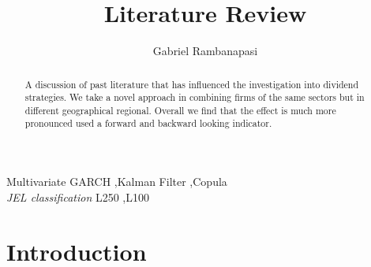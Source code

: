 \documentclass[11pt,preprint, authoryear]{elsarticle}
\numberwithin{equation}{section}
\numberwithin{figure}{section}
\numberwithin{table}{section}
\begin{document}
\begin{frontmatter}  %

\title{Literature Review}





\author[Add1]{Gabriel Rambanapasi}





\address[Add1]{Stellenbosch University, Cape Town, South Africa}


\begin{abstract}
\small{
A discussion of past literature that has influenced the investigation
into dividend strategies. We take a novel approach in combining firms of
the same sectors but in different geographical regional. Overall we find
that the effect is much more pronounced used a forward and backward
looking indicator.
}
\end{abstract}

\vspace{1cm}


\begin{keyword}
\footnotesize{
Multivariate GARCH \sep Kalman Filter \sep Copula \\
\vspace{0.3cm}
}
\footnotesize{
\textit{JEL classification} L250 \sep L100
}
\end{keyword}



\vspace{0.5cm}

\end{frontmatter}

\setcounter{footnote}{0}



\pagestyle{fancy}
\chead{}
\rhead{}
\lfoot{}
\lhead{}
\cfoot{}


\headsep 35pt %




\hypertarget{introduction}{%
\section{\texorpdfstring{Introduction
\label{Introduction}}{Introduction }}\label{introduction}}
\end{document}
